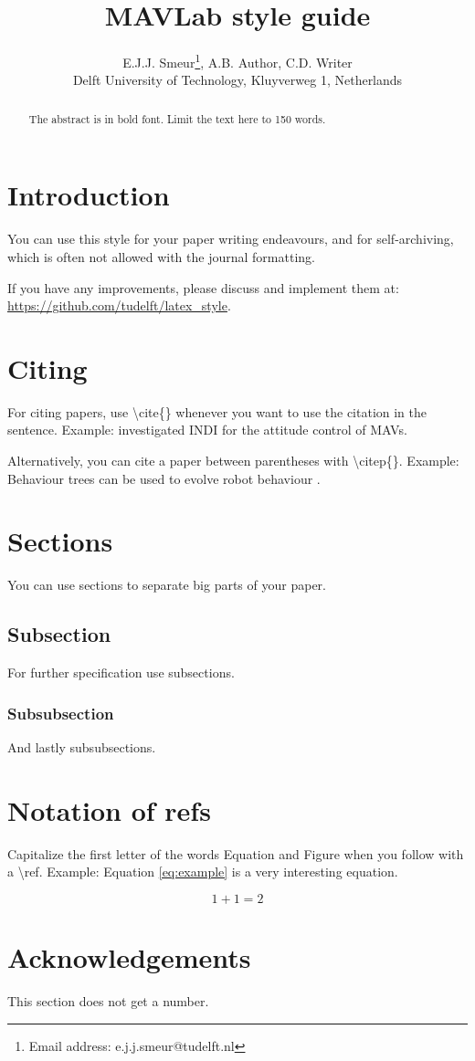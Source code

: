 \documentclass{article}
\title{MAVLab style guide}
\author{E.J.J. Smeur\thanks{Email address: e.j.j.smeur@tudelft.nl}, A.B. Author, C.D. Writer \\ Delft University of Technology, Kluyverweg 1, Netherlands}
\begin{document}
\maketitle
\begin{abstract}
	The abstract is in bold font.
	Limit the text here to 150 words.
	\end{abstract}

\section{Introduction}
You can use this style for your paper writing endeavours, and for self-archiving, which is often not allowed with the journal formatting.

If you have any improvements, please discuss and implement them at: \url{https://github.com/tudelft/latex_style}.

\section{Citing}
For citing papers, use \textbackslash cite\{\} whenever you want to use the citation in the sentence.
Example: \cite{smeur} investigated INDI for the attitude control of MAVs.

Alternatively, you can cite a paper between parentheses with \textbackslash citep\{\}.
Example: Behaviour trees can be used to evolve robot behaviour \citep{Scheper2016a}.

\section{Sections}

You can use sections to separate big parts of your paper.

\subsection{Subsection}

For further specification use subsections.

\subsubsection{Subsubsection}
And lastly subsubsections.

\section{Notation of refs}

Capitalize the first letter of the words Equation and Figure when you follow with a \textbackslash ref.
Example: Equation \ref{eq:example} is a very interesting equation.

\begin{equation}
	1 + 1 = 2
	\label{eq:example}
\end{equation}

\section*{Acknowledgements}
This section does not get a number.


\end{document}
